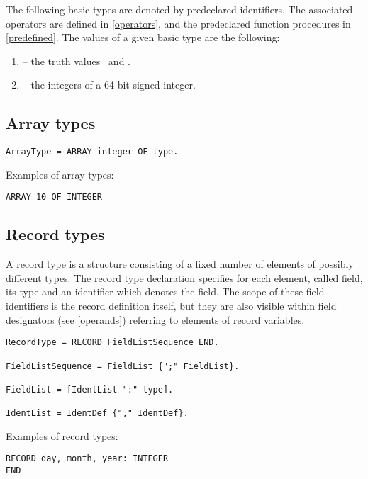 \documentclass[12pt]{article}
\begin{document}
The following basic types are denoted by predeclared identifiers. The associated operators are defined in \ref{operators}, and the predeclared function procedures in \ref{predefined}. The values of a given basic type are the following:

\begin{enumerate}
    \item \BOOLEAN -- the truth values \TRUE\ and \FALSE.
    \item \INTEGER -- the integers of a 64-bit signed integer.
\end{enumerate}

\subsection{Array types}

\begin{lstlisting}[style=ebnf]
ArrayType = ARRAY integer OF type. 
\end{lstlisting}

Examples of array types:
\begin{lstlisting}[style=example]
ARRAY 10 OF INTEGER 
\end{lstlisting}

\subsection{Record types}
\label{records}
A record type is a structure consisting of a fixed number of elements of possibly different types. The record type declaration specifies for each element, called field, its type and an identifier which denotes the field. The scope of these field identifiers is the record definition itself, but they are also visible within field designators (see \ref{operands}) referring to elements of record variables.

\begin{lstlisting}[style=ebnf]
RecordType = RECORD FieldListSequence END.

FieldListSequence = FieldList {";" FieldList}.

FieldList = [IdentList ":" type].

IdentList = IdentDef {"," IdentDef}.
\end{lstlisting}

Examples of record types:
\begin{lstlisting}[style=example]
RECORD day, month, year: INTEGER 
END
\end{lstlisting}
\end{document}
